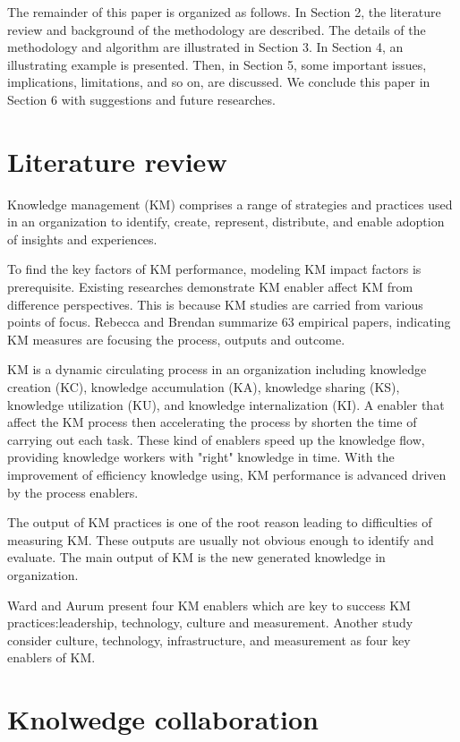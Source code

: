\documentclass{elsarticle}
\begin{document}
The remainder of this paper is organized as follows. In Section 2, the
literature review and background of the methodology
are described. The details of the methodology and algorithm  are illustrated in Section 3. In Section 4, an illustrating
example is presented. Then, in Section 5, some important issues, implications, limitations, and so
on, are discussed. We conclude this paper in Section 6 with suggestions and future researches.            


\section{Literature review}
\label{sec:literature-review}

Knowledge management (KM) comprises a range of strategies and
practices used in an organization to identify, create, represent,
distribute, and enable adoption of insights  and
experiences. 

To find the key factors of KM performance, modeling KM impact  factors
is prerequisite. Existing researches demonstrate KM enabler affect KM
from difference perspectives. This is because KM studies are carried
from various points of focus.  Rebecca and Brendan
summarize 63 empirical papers, indicating KM measures are focusing the
process, outputs and outcome\cite{Mitchell2010}.

KM is a dynamic circulating process in an
organization including  knowledge
creation (KC), knowledge accumulation (KA), knowledge sharing (KS), knowledge utilization
(KU), and knowledge internalization (KI)\cite{ChangLee2005469}. A
enabler that affect the KM process then accelerating the process by
shorten the time of carrying out each task. These kind of enablers
 speed up the knowledge flow, providing knowledge workers with
 "right" knowledge in time. With the improvement of efficiency
 knowledge using, KM performance is advanced driven by the process
 enablers. 

The output of KM practices is one of the root reason leading to
difficulties of measuring KM. These outputs are usually not obvious
enough to identify and evaluate. The main output of KM is the new
generated knowledge in organization.   

 Ward and Aurum present four KM enablers which are key
to success KM practices:leadership, technology, culture and
measurement. Another study  consider culture, technology, infrastructure, and
measurement as four key enablers of KM.    
\section{Knolwedge collaboration}
\label{sec:knolw-coll}
\end{document}
